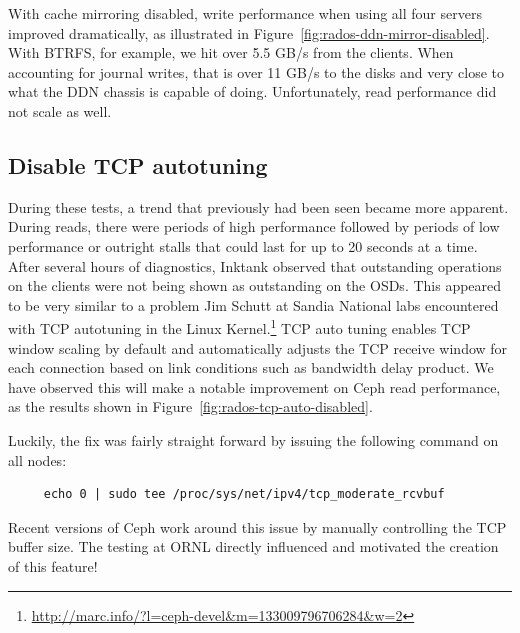 \documentclass{article}
\begin{document}
With cache mirroring disabled, write performance when using all four servers
improved dramatically, as illustrated in
Figure~\ref{fig:rados-ddn-mirror-disabled}. With BTRFS, for example, we hit over
5.5 GB/s from the clients.  When accounting for journal writes, that is over
11 GB/s to the disks and very close to what the DDN chassis is capable of doing. 
Unfortunately, read performance did not scale as well.


\subsection{Disable TCP autotuning}

During these tests, a trend that previously had been seen became more apparent.
During reads, there were periods of high performance followed by periods of low
performance or outright stalls that could last for up to 20 seconds at a time.
After several hours of diagnostics, Inktank observed that outstanding operations
on the clients were not being shown as outstanding on the OSDs.  This appeared
to be very similar to a problem Jim Schutt at Sandia National labs encountered
with TCP autotuning in the Linux Kernel.\footnote{\url{http://marc.info/?l=ceph-devel&m=133009796706284&w=2}}
TCP auto tuning enables TCP window scaling by default and automatically adjusts
the TCP receive window for each connection based on link conditions such as
bandwidth delay product. We have observed this will make a notable improvement
on Ceph read performance, as the results shown in
Figure~\ref{fig:rados-tcp-auto-disabled}.


Luckily, the fix was fairly straight forward by issuing the following command on all nodes:

\begin{Verbatim}
     echo 0 | sudo tee /proc/sys/net/ipv4/tcp_moderate_rcvbuf
\end{Verbatim}

Recent versions of Ceph work around this issue by manually controlling the TCP
buffer size.  The testing at ORNL directly influenced and motivated the creation
of this feature!
\end{document}
